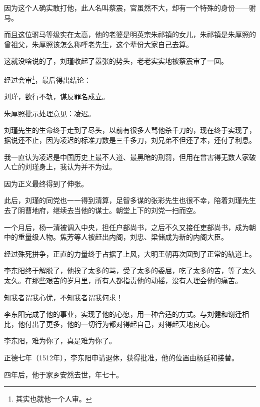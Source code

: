 \begin{multicols}{\theparacolNo}
		因为这个人确实敢打他，此人名叫蔡震，官虽然不大，却有一个特殊的身份——驸马。

		而且这位驸马等级实在太高，他的老婆是明英宗朱祁镇的女儿，朱祁镇是朱厚照的曾祖父，朱厚照该怎么称呼老先生，这个辈份大家自己去算。

		这就没啥说的了，刘瑾收起了嚣张的势头，老老实实地被蔡震审了一回。

		经过会审\footnote{其实也就他一个人审。}，最后得出结论：

		刘瑾，欲行不轨，谋反罪名成立。

		朱厚照批示处理意见：凌迟。

		刘瑾先生的生命终于走到了尽头，以前有很多人骂他杀千刀的，现在终于实现了，据说还不止，因为凌迟的标准刀数是三千多刀，刘兄弟不但还了本，还付了利息。

		我一直认为凌迟是中国历史上最不人道、最黑暗的刑罚，但用在曾害得无数人家破人亡的刘瑾身上，我认为并不为过。

		因为正义最终得到了伸张。

		此后，刘瑾的同党也一一得到清算，足智多谋的张彩先生也很不幸，陪着刘瑾先生去了阴曹地府，继续去当他的谋士。朝堂上下的刘党一扫而空。

		一个月后，杨一清被调入中央，担任户部尚书，之后不久又接任吏部尚书，成为朝中的重量级人物。焦芳等人被赶出内阁，刘忠、梁储成为新的内阁大臣。

		经过殊死拼争，正直的力量终于占据了上风，大明王朝再次回到了正常的轨道上。

		李东阳终于解脱了，他挨了太多的骂，受了太多的委屈，吃了太多的苦，等了太久太久。在那些艰苦的岁月里，所有人都指责他的动摇，没有人理会他的痛苦。

		知我者谓我心忧，不知我者谓我何求！

		李东阳完成了他的事业，实现了他的心愿，用一种合适的方式。与刘健和谢迁相比，他付出了更多，他的一切行为都对得起自己，对得起天地良心。

		李东阳，难为你了，真是难为你了。

		正德七年（1512年），李东阳申请退休，获得批准，他的位置由杨廷和接替。

		四年后，他于家乡安然去世，年七十。
		\ifnum{}
	\end{multicols}
\fi
\newpage
